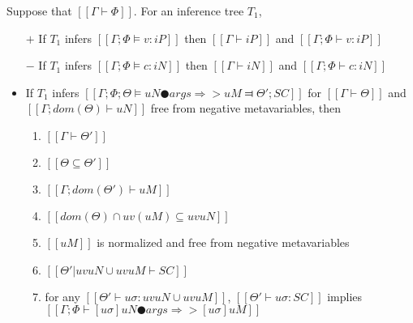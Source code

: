 \begin{lemma} \label{lemma:typing-soundness}
    Suppose that $[[Γ ⊢ Φ]]$.
    For an inference tree $T_1$,
    \hfill
    \begin{itemize}
        \item [$+$] If $T_1$ infers $[[Γ; Φ ⊨ v : iP]]$ then $[[Γ ⊢ iP]]$ and $[[Γ; Φ ⊢ v : iP]]$
        \item [$-$] If $T_1$ infers $[[Γ; Φ ⊨ c : iN]]$ then $[[Γ ⊢ iN]]$ and $[[Γ; Φ ⊢ c : iN]]$
        \item  If $T_1$ infers $[[Γ; Φ; Θ ⊨ uN ● args ⇒> uM ⫤ Θ'; SC]]$
                for $[[Γ ⊢ Θ]]$ and $[[Γ; dom(Θ) ⊢  uN]]$ free from negative metavariables, 
                then
            \begin{enumerate}
                \item $[[Γ ⊢ Θ']]$
                \item $[[Θ ⊆ Θ']]$
                \item $[[Γ; dom(Θ') ⊢  uM]]$
                \item $[[dom(Θ) ∩ uv(uM) ⊆ uv uN]]$
                \item $[[uM]]$ is normalized and free from negative metavariables
                \item $[[Θ'|uv uN ∪ uv uM ⊢ SC]]$
                \item for any $[[ Θ' ⊢ uσ : uv uN ∪ uv uM ]]$,
                    $[[ Θ' ⊢ uσ : SC ]]$ implies $[[ Γ ; Φ ⊢ [uσ]uN ● args ⇒> [uσ]uM ]]$
            \end{enumerate}
    \end{itemize}
\end{lemma}
